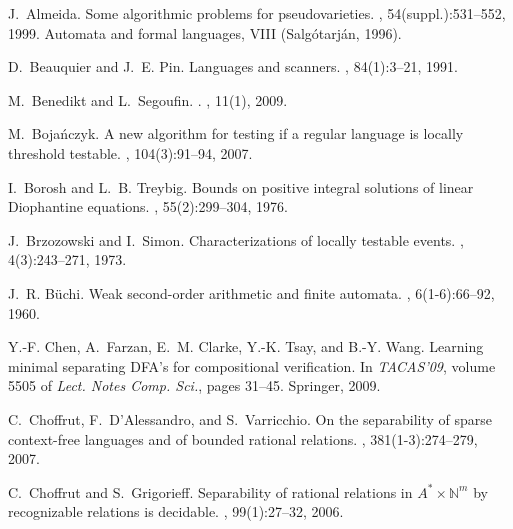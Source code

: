 \documentclass{LMCS}
\theoremstyle{plain}
\begin{document}
\begin{thebibliography}{10}

J.~Almeida.
\newblock Some algorithmic problems for pseudovarieties.
, 54(suppl.):531--552, 1999.
\newblock Automata and formal languages, VIII (Salg{\'o}tarj{\'a}n, 1996).

D.~Beauquier and J.~E. Pin.
\newblock Languages and scanners.
, 84(1):3--21, 1991.

M.~Benedikt and L.~Segoufin.
.
, 11(1), 2009.

M.~Boja{\'n}czyk.
\newblock A new algorithm for testing if a regular language is locally
  threshold testable.
, 104(3):91--94, 2007.

I.~Borosh and L.~B. Treybig.
\newblock Bounds on positive integral solutions of linear {Diophantine}
  equations.
, 55(2):299--304, 1976.

J.~Brzozowski and I.~Simon.
\newblock Characterizations of locally testable events.
, 4(3):243--271, 1973.

J.~R. B{\"u}chi.
\newblock Weak second-order arithmetic and finite automata.
, 6(1-6):66--92, 1960.

Y.-F. Chen, A.~Farzan, E.~M. Clarke, Y.-K. Tsay, and B.-Y. Wang.
\newblock Learning minimal separating {DFA}'s for compositional verification.
\newblock In {\em {TACAS'09}}, volume 5505 of {\em Lect. Notes Comp. Sci.},
  pages 31--45. Springer, 2009.

C.~Choffrut, F.~D'Alessandro, and S.~Varricchio.
\newblock On the separability of sparse context-free languages and of bounded
  rational relations.
, 381(1-3):274--279, 2007.

C.~Choffrut and S.~Grigorieff.
\newblock Separability of rational relations in {$A^* \times \mathbb{N}^m$} by
  recognizable relations is decidable.
, 99(1):27--32, 2006.


\end{thebibliography}
\end{document}
